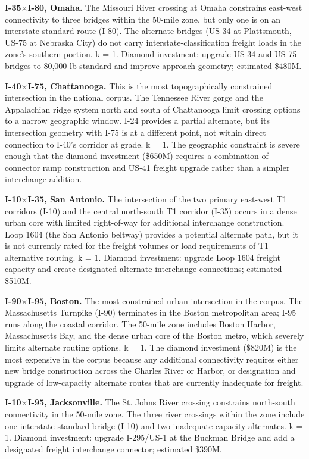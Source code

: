 \textbf{I-35$\times$I-80, Omaha.} The Missouri River crossing at Omaha constrains east-west connectivity to three bridges within the 50-mile zone, but only one is on an interstate-standard route (I-80). The alternate bridges (US-34 at Plattsmouth, US-75 at Nebraska City) do not carry interstate-classification freight loads in the zone's southern portion. k = 1. Diamond investment: upgrade US-34 and US-75 bridges to 80,000-lb standard and improve approach geometry; estimated \$480M.

\textbf{I-40$\times$I-75, Chattanooga.} This is the most topographically constrained intersection in the national corpus. The Tennessee River gorge and the Appalachian ridge system north and south of Chattanooga limit crossing options to a narrow geographic window. I-24 provides a partial alternate, but its intersection geometry with I-75 is at a different point, not within direct connection to I-40's corridor at grade. k = 1. The geographic constraint is severe enough that the diamond investment (\$650M) requires a combination of connector ramp construction and US-41 freight upgrade rather than a simpler interchange addition.

\textbf{I-10$\times$I-35, San Antonio.} The intersection of the two primary east-west T1 corridors (I-10) and the central north-south T1 corridor (I-35) occurs in a dense urban core with limited right-of-way for additional interchange construction. Loop 1604 (the San Antonio beltway) provides a potential alternate path, but it is not currently rated for the freight volumes or load requirements of T1 alternative routing. k = 1. Diamond investment: upgrade Loop 1604 freight capacity and create designated alternate interchange connections; estimated \$510M.

\textbf{I-90$\times$I-95, Boston.} The most constrained urban intersection in the corpus. The Massachusetts Turnpike (I-90) terminates in the Boston metropolitan area; I-95 runs along the coastal corridor. The 50-mile zone includes Boston Harbor, Massachusetts Bay, and the dense urban core of the Boston metro, which severely limits alternate routing options. k = 1. The diamond investment (\$820M) is the most expensive in the corpus because any additional connectivity requires either new bridge construction across the Charles River or Harbor, or designation and upgrade of low-capacity alternate routes that are currently inadequate for freight.

\textbf{I-10$\times$I-95, Jacksonville.} The St. Johns River crossing constrains north-south connectivity in the 50-mile zone. The three river crossings within the zone include one interstate-standard bridge (I-10) and two inadequate-capacity alternates. k = 1. Diamond investment: upgrade I-295/US-1 at the Buckman Bridge and add a designated freight interchange connector; estimated \$390M.

